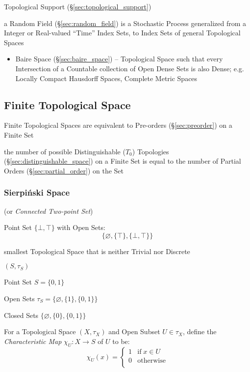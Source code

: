 \fist Topological Support (\S\ref{sec:topological_support})

\fist a Random Field (\S\ref{sec:random_field}) is a Stochastic Process
generalized from a Integer or Real-valued ``Time'' Index Sets, to Index Sets of
general Topological Spaces

\asterism

\begin{itemize}
  \item Baire Space (\S\ref{sec:baire_space}) -- Topological Space such that
    every Intersection of a Countable collection of Open Dense Sets is also
    Dense; e.g. Locally Compact Hausdorff Spaces, Complete Metric Spaces
\end{itemize}



\subsection{Finite Topological Space}\label{sec:finite_topological_space}

Finite Topological Spaces are equivalent to Pre-orders (\S\ref{sec:preorder}) on
a Finite Set

the number of possible Distinguishable ($T_0$) Topologies
(\S\ref{sec:distinguishable_space}) on a Finite Set is equal to the number of
Partial Orders (\S\ref{sec:partial_order}) on the Set



\subsubsection{Sierpi\'nski Space}\label{sec:sierpinski_space}

(or \emph{Connected Two-point Set})

Point Set $\{ \bot, \top \}$ with Open Sets:
\[
  \{ \varnothing, \{\top\}, \{\bot, \top\} \}
\]

smallest Topological Space that is neither Trivial nor Discrete

$(S,\tau_S)$

Point Set $S = \{0,1\}$

Open Sets $\tau_S = \{\varnothing, \{1\}, \{0,1\}\}$

Closed Sets $\{\varnothing, \{0\}, \{0,1\}\}$

For a Topological Space $(X,\tau_X)$ and Open Subset $U \in \tau_X$,
define the \emph{Characteristic Map} $\chi_U : X \rightarrow S$ of $U$ to be:
\[
  \chi_U (x) =
  \begin{cases}
    1  & \text{if}\; x \in U \\
    0  & \text{otherwise} \\
  \end{cases}
\]

